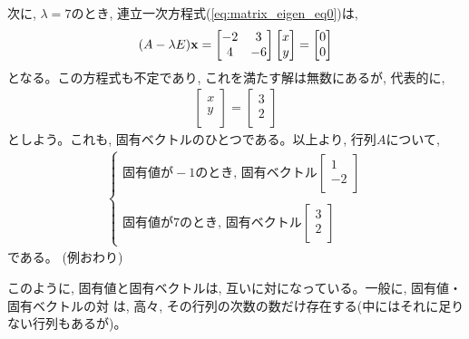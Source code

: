 \begin{exmpl}
次に, $\lambda=7$のとき, 連立一次方程式(\ref{eq:matrix_eigen_eq0})は, 
\begin{eqnarray}
(A-\lambda E){\bf x}=
\begin{bmatrix}
-2         & 3 \\
4          & -6 \\
\end{bmatrix}
\begin{bmatrix}
x \\
y \\
\end{bmatrix}
=\begin{bmatrix}
0 \\
0 \\
\end{bmatrix}\end{eqnarray}
となる。この方程式も不定であり, これを満たす解は無数にあるが, 代表的に, 
\begin{eqnarray}
\begin{bmatrix}
x \\
y \\
\end{bmatrix}
=\begin{bmatrix}
3 \\
2 \\
\end{bmatrix}
\end{eqnarray}
としよう。これも, 固有ベクトルのひとつである。以上より, 行列$A$について, 
\begin{eqnarray*}\begin{cases}
\text{固有値が}-1\text{のとき, 固有ベクトル}
\begin{bmatrix}
1 \\
-2 \\
\end{bmatrix}\\
\\
\text{固有値が}7\text{のとき, 固有ベクトル}
\begin{bmatrix}
3 \\
2 \\
\end{bmatrix}
\end{cases}\end{eqnarray*}
である。
(例おわり)\end{exmpl}

このように, 固有値と固有ベクトルは, 互いに対になっている。一般に, 固有値・固有ベクトルの対
は, 高々, その行列の次数の数だけ存在する(中にはそれに足りない行列もあるが)。

